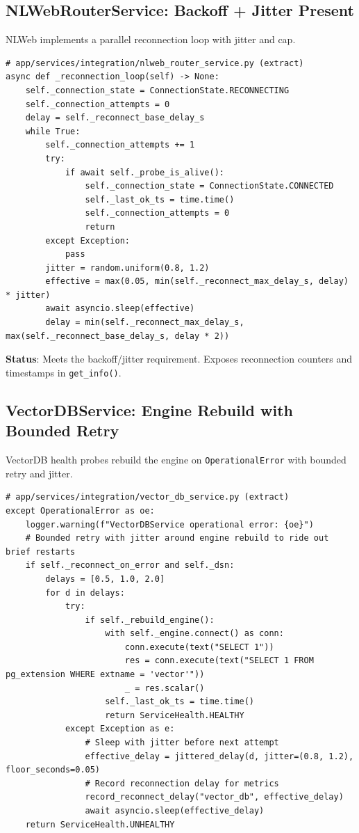 \documentclass[11pt]{article}
\begin{document}
\subsection{NLWebRouterService: Backoff + Jitter Present}
NLWeb implements a parallel reconnection loop with jitter and cap.

\begin{verbatim}
# app/services/integration/nlweb_router_service.py (extract)
async def _reconnection_loop(self) -> None:
    self._connection_state = ConnectionState.RECONNECTING
    self._connection_attempts = 0
    delay = self._reconnect_base_delay_s
    while True:
        self._connection_attempts += 1
        try:
            if await self._probe_is_alive():
                self._connection_state = ConnectionState.CONNECTED
                self._last_ok_ts = time.time()
                self._connection_attempts = 0
                return
        except Exception:
            pass
        jitter = random.uniform(0.8, 1.2)
        effective = max(0.05, min(self._reconnect_max_delay_s, delay) * jitter)
        await asyncio.sleep(effective)
        delay = min(self._reconnect_max_delay_s, max(self._reconnect_base_delay_s, delay * 2))
\end{verbatim}

\textbf{Status}: Meets the backoff/jitter requirement. Exposes reconnection counters and timestamps in \texttt{get\_info()}.

\subsection{VectorDBService: Engine Rebuild with Bounded Retry}
VectorDB health probes rebuild the engine on \texttt{OperationalError} with bounded retry and jitter.

\begin{verbatim}
# app/services/integration/vector_db_service.py (extract)
except OperationalError as oe:
    logger.warning(f"VectorDBService operational error: {oe}")
    # Bounded retry with jitter around engine rebuild to ride out brief restarts
    if self._reconnect_on_error and self._dsn:
        delays = [0.5, 1.0, 2.0]
        for d in delays:
            try:
                if self._rebuild_engine():
                    with self._engine.connect() as conn:
                        conn.execute(text("SELECT 1"))
                        res = conn.execute(text("SELECT 1 FROM pg_extension WHERE extname = 'vector'"))
                        _ = res.scalar()
                    self._last_ok_ts = time.time()
                    return ServiceHealth.HEALTHY
            except Exception as e:
                # Sleep with jitter before next attempt
                effective_delay = jittered_delay(d, jitter=(0.8, 1.2), floor_seconds=0.05)
                # Record reconnection delay for metrics
                record_reconnect_delay("vector_db", effective_delay)
                await asyncio.sleep(effective_delay)
    return ServiceHealth.UNHEALTHY
\end{verbatim}
\end{document}
